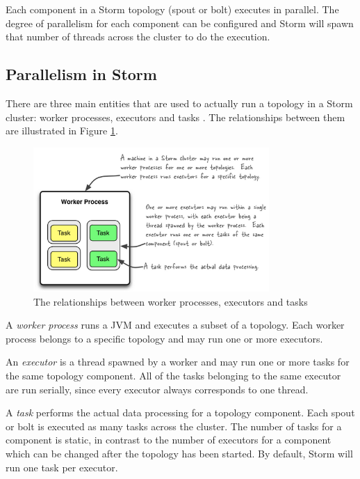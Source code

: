Each component in a Storm topology (spout or bolt) executes in parallel. The degree of parallelism for each component can be configured and Storm will spawn that number of threads across the cluster to do the execution.

\subsection{Parallelism in Storm}

There are three main entities that are used to actually run a topology in a Storm cluster: worker processes, executors and tasks \cite{storm_parallelism}. The relationships between them are illustrated in Figure \ref{figure:storm_parallelism}.

\begin{figure}[h!]
\centering
\includegraphics[width=0.8\textwidth]{figures/storm_parallelism}
\caption{The relationships between worker processes, executors and tasks}
\label{figure:storm_parallelism}
\end{figure}

A \emph{worker process} runs a JVM and executes a subset of a topology. Each worker process belongs to a specific topology and may run one or more executors.

An \emph{executor} is a thread spawned by a worker and may run one or more tasks for the same topology component. All of the tasks belonging to the same executor are run serially, since every executor always corresponds to one thread.

A \emph{task} performs the actual data processing for a topology component. Each spout or bolt is executed as many tasks across the cluster. The number of tasks for a component is static, in contrast to the number of executors for a component which can be changed after the topology has been started. By default, Storm will run one task per executor.

